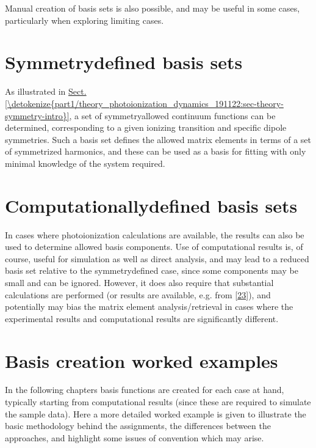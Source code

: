 \documentclass[letterpaper,table,10pt,english]{jupyterBook}
\begin{document}
\sphinxAtStartPar
Manual creation of basis sets is also possible, and may be useful in some cases, particularly when exploring limiting cases.


\section{Symmetry\sphinxhyphen{}defined basis sets}
\label{\detokenize{part2/sym-fitting-intro_220423:symmetry-defined-basis-sets}}
\sphinxAtStartPar
As illustrated in \hyperref[\detokenize{part1/theory_photoionization_dynamics_191122:sec-theory-symmetry-intro}]{Sect.\@ \ref{\detokenize{part1/theory_photoionization_dynamics_191122:sec-theory-symmetry-intro}}}, a set of symmetry\sphinxhyphen{}allowed continuum functions can be determined, corresponding to a given ionizing transition and specific dipole symmetries. Such a basis set defines the allowed matrix elements in terms of a set of symmetrized harmonics, and these can be used as a basis for fitting with only minimal knowledge of the system required.


\section{Computationally\sphinxhyphen{}defined basis sets}
\label{\detokenize{part2/sym-fitting-intro_220423:computationally-defined-basis-sets}}
\sphinxAtStartPar
In cases where photoionization calculations are available, the results can also be used to determine allowed basis components. Use of  computational results is, of course, useful for simulation as well as direct analysis, and may lead to a reduced basis set relative to the symmetry\sphinxhyphen{}defined case, since some components may be small and can be ignored. However, it does also require that substantial calculations are performed (or results are available, e.g. from  {[}\hyperlink{cite.backmatter/bibliography:id615}{23}{]}), and \sphinxhyphen{} potentially \sphinxhyphen{} may bias the matrix element analysis/retrieval in cases where the experimental results and computational results are significantly different.


\section{Basis creation worked examples}
\label{\detokenize{part2/sym-fitting-intro_220423:basis-creation-worked-examples}}
\sphinxAtStartPar
In the following chapters basis functions are created for each case at hand, typically starting from  computational results (since these are required to simulate the sample data). Here a more detailed worked example is given to illustrate the basic methodology behind the assignments, the differences between the approaches, and highlight some issues of convention which may arise.
\end{document}
